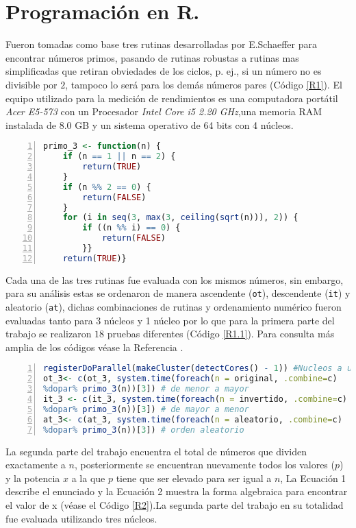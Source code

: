 \documentclass{article}
\begin{document}
\section{Programación en R.}
Fueron tomadas como base tres rutinas desarrolladas por E.Schaeffer \citep{E.Schaeffer} para encontrar números primos, pasando de rutinas robustas a rutinas mas simplificadas que retiran obviedades de los ciclos, p. ej., si un número no es divisible por $2$, tampoco lo será para los demás números pares (Código \ref{R1}).
El equipo utilizado para la medición de rendimientos es una computadora portátil \emph{Acer E5-573 } con un Procesador \emph{Intel Core i5 2.20 GHz},una memoria RAM instalada de 8.0 GB y un sistema operativo de 64 bits con 4 núcleos.
\lstset{basicstyle=\ttfamily, keywordstyle=\bfseries}
\begin{lstlisting}[frame=single,numbers=left,language=R,caption=Rutina No3 eliminando los números no divisibles entre $2$ y utilizando la funcipon \texttt{ceiling}. \label{R1}]
  primo_3 <- function(n) {
    if (n == 1 || n == 2) {
        return(TRUE)
    }
    if (n %% 2 == 0) {
        return(FALSE)
    }
    for (i in seq(3, max(3, ceiling(sqrt(n))), 2)) {
        if ((n %% i) == 0) {
            return(FALSE)
        }}
    return(TRUE)}
\end{lstlisting}  
Cada una de las tres rutinas fue evaluada con los mismos números, sin embargo, para su análisis estas se ordenaron de manera ascendente (\texttt{ot}), descendente (\texttt{it}) y aleatorio (\texttt{at}), dichas combinaciones de rutinas y ordenamiento numérico fueron evaluadas tanto para 3 núcleos y 1 núcleo por lo que para la primera parte del trabajo se realizaron $18$ pruebas diferentes (Código \ref{R1.1}). Para consulta más amplia de los códigos véase la Referencia \citep{REPOP2}.
\lstset{basicstyle=\ttfamily, keywordstyle=\bfseries}
\begin{lstlisting}[frame=single,numbers=left,language=R,caption=La rutina 3 evaluada para cada ordenamiento de los números y la selección de los núcleos a utilizar. \label{R1.1}]
registerDoParallel(makeCluster(detectCores() - 1)) #Nucleos a utilizar
ot_3<- c(ot_3, system.time(foreach(n = original, .combine=c)
%dopar% primo_3(n))[3]) # de menor a mayor
it_3 <- c(it_3, system.time(foreach(n = invertido, .combine=c)
%dopar% primo_3(n))[3]) # de mayor a menor
at_3<- c(at_3, system.time(foreach(n = aleatorio, .combine=c) 
%dopar% primo_3(n))[3]) # orden aleatorio
\end{lstlisting}
La segunda parte del trabajo encuentra el total de números que dividen exactamente a $n$, posteriormente se encuentran nuevamente todos los valores ($p$) y la potencia $x$ a la que $p$ tiene que ser elevado para ser igual a $n$, La Ecuación 1 describe el enunciado y la Ecuación 2 muestra la forma algebraica para encontrar el valor de x (véase el Código \ref{R2}).La segunda parte del trabajo en su totalidad fue evaluada utilizando tres núcleos.
\end{document}
